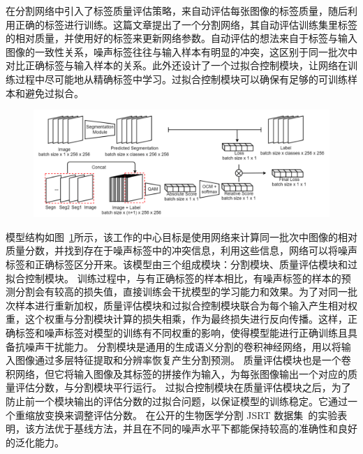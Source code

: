 \citet{Zhu2019PickandLearnAQ} 在分割网络中引入了标签质量评估策略，来自动评估每张图像的标签质量，随后利用正确的标签进行训练。这篇文章提出了一个分割网络，其自动评估训练集里标签的相对质量，并使用好的标签来更新网络参数。自动评估的想法来自于标签与输入图像的一致性关系，噪声标签往往与输入样本有明显的冲突，这区别于同一批次中对比正确标签与输入样本的关系。此外还设计了一个过拟合控制模块，让网络在训练过程中尽可能地从精确标签中学习。过拟合控制模块可以确保有足够的可训练样本和避免过拟合。
    \begin{figure}[tbp]
        \centering 
        \includegraphics[width=1.0\textwidth]{img/c2/rel_c1.png}
        \label{c2_fig11m}
    \end{figure}
模型结构如图~\ref{c2_fig11m}所示，该工作的中心目标是使用网络来计算同一批次中图像的相对质量分数，并找到存在于噪声标签中的冲突信息，利用这些信息，网络可以将噪声标签和正确标签区分开来。该模型由三个组成模块：分割模块、质量评估模块和过拟合控制模块。
训练过程中，与有正确标签的样本相比，有噪声标签的样本的预测分割会有较高的损失值，直接训练会干扰模型的学习能力和效果。为了对同一批次样本进行重新加权，质量评估模块和过拟合控制模块联合为每个输入产生相对权重，这个权重与分割模块计算的损失相乘，作为最终损失进行反向传播。这样，正确标签和噪声标签对模型的训练有不同权重的影响，使得模型能进行正确训练且具备抗噪声干扰能力。
分割模块是通用的生成语义分割的卷积神经网络，用以将输入图像通过多层特征提取和分辨率恢复产生分割预测。
质量评估模块也是一个卷积网络，但它将输入图像及其标签的拼接作为输入，为每张图像输出一个对应的质量评估分数，与分割模块平行运行。
过拟合控制模块在质量评估模块之后，为了防止前一个模块输出的评估分数的过拟合问题，以保证模型的训练稳定。它通过一个重缩放变换来调整评估分数。
在公开的生物医学分割 JSRT 数据集~\cite{Shiraishi2000DevelopmentOA}的实验表明，该方法优于基线方法，并且在不同的噪声水平下都能保持较高的准确性和良好的泛化能力。


